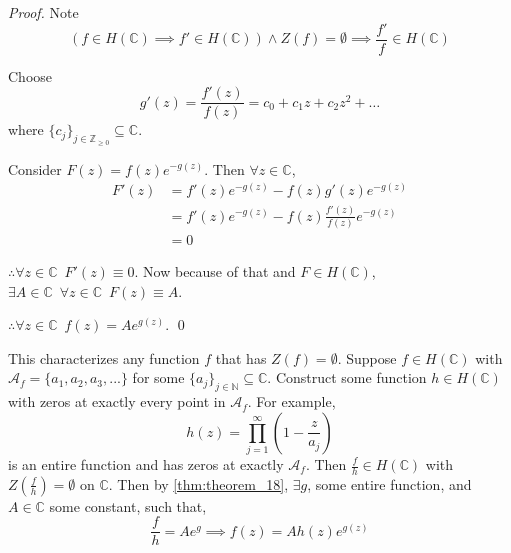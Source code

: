 \documentclass[notoc,notitlepage]{tufte-book}
\begin{document}
\begin{proof}

  Note
  \begin{equation*}
    \left( f \in H(\mathbb{C}) \implies f' \in H(\mathbb{C}) \right) \land Z(f) = \emptyset \implies \frac{f'}{f} \in H(\mathbb{C})
  \end{equation*}

  Choose
  \begin{equation*}
    g'(z) = \frac{f'(z)}{f(z)} = c_0 + c_1 z + c_2 z^2 + \hdots
  \end{equation*}
  where $\{c_j\}_{j \in \mathbb{Z}_{\geq 0}} \subseteq \mathbb{C}$.

  Consider $F(z) = f(z) e^{-g(z)}$. Then $\forall z \in \mathbb{C}$,
  \begin{align*}
    F'(z) &= f'(z) e^{-g(z)} - f(z)g'(z) e^{-g(z)} \\
      &= f'(z) e^{-g(z)} - f(z) \frac{f'(z)}{f(z)} e^{-g(z)} \\
      &= 0
  \end{align*}

  $\therefore \forall z \in \mathbb{C} \enspace F'(z) \equiv 0$. Now because of that and $F \in H(\mathbb{C})$, $\exists A \in \mathbb{C} \enspace \forall z \in \mathbb{C} \enspace F(z) \equiv A$.

  $\therefore \forall z \in \mathbb{C} \enspace f(z) = Ae^{g(z)}$. \qed
\end{proof}

This characterizes any function $f$ that has $Z(f) = \emptyset$. Suppose $f \in H(\mathbb{C})$ with $\mathscr{A}_f = \{a_1, a_2, a_3, ... \}$ for some $\{a_j\}_{j \in \mathbb{N}} \subseteq \mathbb{C}$. Construct some function $h \in H(\mathbb{C})$ with zeros at exactly every point in $\mathscr{A}_f$. For example,
\begin{equation*}
  h(z) = \prod_{j=1}^{\infty} \left(1 - \frac{z}{a_j} \right)
\end{equation*}
is an entire function and has zeros at exactly $\mathscr{A}_f$. Then $\frac{f}{h} \in H(\mathbb{C})$ with $Z(\frac{f}{h}) = \emptyset$ on $\mathbb{C}$. Then by \cref{thm:theorem_18}, $\exists g$, some entire function, and $A \in \mathbb{C}$ some constant, such that,
\begin{equation*}
  \frac{f}{h} = Ae^{g} \implies f(z) = Ah(z) e^{g(z)}
\end{equation*}
\end{document}

